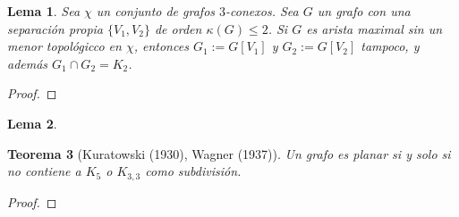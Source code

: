 \documentclass[12pt]{report}
\theoremstyle{plain}
\newtheorem{theorem}{Teorema}[section]
\newtheorem{lemma}[theorem]{Lema}
\theoremstyle{definition}
\begin{document}
\begin{lemma}\label{lema:teorema de Kuratowski - lema 2}
Sea \textbf{$ \chi$} un conjunto de grafos $3$-conexos. Sea $G$ un grafo con una separación propia $\{V_1, V_2\}$ de orden $\kappa (G) \leq 2$. Si $G$ es arista maximal sin un menor topológicco en \textbf{$ \chi$}, entonces $G_1 := G[V_1]$ y $G_2 := G[V_2]$ tampoco, y además $G_1 \cap G_2 = K_2$.
\end{lemma}
\begin{proof}

\end{proof}

\begin{lemma}\label{lema:teorema de Kuratowski - lema 3}

\end{lemma}

\begin{theorem}[Kuratowski (1930), Wagner (1937)]
Un grafo es planar si y solo si no contiene a $K_5$ o $K_{3,3}$ como subdivisión.
\end{theorem}
\begin{proof}

\end{proof}
\end{document}
